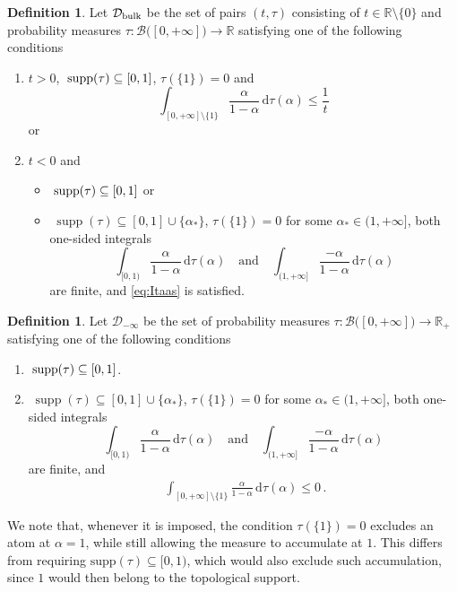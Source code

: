 \documentclass[aps,pra,11pt,onecolumn,nofootinbib,tightenlines]{revtex4-2}
\theoremstyle{definition}
\newtheorem{definition}[theorem]{Definition}
\newcommand{\D}{\mathcal{D}}
\newcommand{\R}{\mathbb{R}}
\newcommand{\mc}[1]{\mathcal{#1}}
\newcommand{\mb}[1]{\mathbb{#1}}
\begin{document}
\begin{definition}
\label{def: D}
Let \(\D_{\rm{bulk}}\) be the set of pairs $(t,\tau)$ consisting of $t\in\R\setminus\{0\}$ and probability measures $\tau:\mc B\big([0,+\infty]\big)\to\mb R$ satisfying one of the following conditions
\begin{enumerate}[itemsep=0pt,topsep=5pt]
    \item $t > 0$, $\;\textup{supp}(\tau) \subseteq [0,1]$, $\tau(\{1\})=0$ and
    \begin{equation}\label{eq:Itaas}
    \int_{[0,+\infty]\setminus\{1\}}\frac{\alpha}{1-\alpha}\,\mathrm{d}\tau(\alpha)\leq\frac{1}{t}
    \end{equation}
    or
    \item $t < 0$ and
    \begin{itemize}
    \item[(a)] $\;\textup{supp}(\tau) \subseteq [0,1]$ or
    \item[(b)] $\;\operatorname{supp}(\tau) \subseteq [0,1] \cup \{\alpha_*\}$, $\tau(\{1\})=0$ for some $\alpha_* \in (1, +\infty]$, both one-sided integrals
    \begin{equation*}
    \int_{[0,1)}\frac{\alpha}{1-\alpha}\,\mathrm{d}\tau(\alpha)
    \quad\text{and}\quad
    \int_{(1,+\infty]}\frac{-\alpha}{1-\alpha}\,\mathrm{d}\tau(\alpha)
    \end{equation*}
    are finite, and \eqref{eq:Itaas} is satisfied.
    \end{itemize}
\end{enumerate}
\end{definition}

\begin{definition}
\label{def: D_infty}
 Let \(\D_{-\infty}\) be the set of probability measures $\tau:\mc B\big([0,+\infty]\big)\to\mb R_+$ satisfying one of the following conditions
    \begin{enumerate}[itemsep=0pt,topsep=5pt]
    \item  $\;\textup{supp}(\tau) \subseteq [0,1]$.
    \item $\;\operatorname{supp}(\tau) \subseteq [0,1] \cup \{\alpha_*\}$, $\tau(\{1\})=0$ for some $\alpha_* \in (1, +\infty]$, both one-sided integrals
    \begin{equation*}
    \int_{[0,1)}\frac{\alpha}{1-\alpha}\,\mathrm{d}\tau(\alpha)
    \quad\text{and}\quad
    \int_{(1,+\infty]}\frac{-\alpha}{1-\alpha}\,\mathrm{d}\tau(\alpha)
    \end{equation*}
    are finite, and
    \begin{align}
        \;\displaystyle\int_{[0,+\infty]\setminus\{1\}} \frac{\alpha}{1 - \alpha} \, \mathrm{d}\tau(\alpha) \leq 0\,.
    \end{align}
\end{enumerate}
\end{definition}
We note that, whenever it is imposed, the condition $\tau(\{1\})=0$
excludes an atom at $\alpha=1$, while still allowing the measure to
accumulate at $1$. This differs from requiring
$\text{supp}(\tau)\subseteq[0,1)$, which would also exclude such accumulation,
since $1$ would then belong to the topological support.
\end{document}
